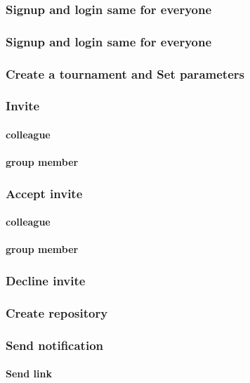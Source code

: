 \documentclass{article}
\begin{document}
            \subsubsection{Signup and login same for everyone}
            \subsubsection{Signup and login same for everyone}
            \subsubsection{Create a tournament and Set parameters}
            \subsubsection{Invite}
                \paragraph*{colleague}

                \paragraph*{group member}
            \subsubsection{Accept invite}
                \paragraph*{colleague}

                \paragraph*{group member}
            \subsubsection{Decline invite}
            \subsubsection{Create repository}
            \subsubsection{Send notification}
                \paragraph*{Send link}
\end{document}
